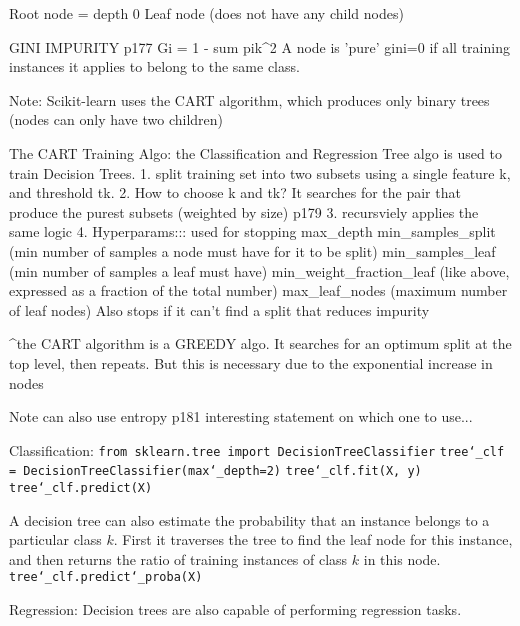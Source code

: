 Root node = depth 0
Leaf node (does not have any child nodes)

GINI IMPURITY
p177
Gi = 1 - sum pik^2
A node is 'pure' gini=0
if all training instances it applies to belong to the same class.

Note:
Scikit-learn uses the CART algorithm,
which produces only binary trees (nodes can only have two children)



The CART Training Algo:
the Classification and Regression Tree algo is used to train Decision Trees.
1. split training set into two subsets using a single feature k, and threshold tk.
2. How to choose k and tk?
It searches for the pair that produce the purest subsets (weighted by size)
p179
3. recursviely applies the same logic
4. Hyperparams::: used for stopping
max_depth
min_samples_split (min number of samples a node must have for it to be split)
min_samples_leaf (min number of samples a leaf must have)
min_weight_fraction_leaf (like above, expressed as a fraction of the total number)
max_leaf_nodes (maximum number of leaf nodes)
Also stops if it can't find a split that reduces impurity

^the CART algorithm is a GREEDY algo.
It searches for an optimum split at the top level, then repeats.
But this is necessary due to the exponential increase in nodes

Note can also use entropy p181
interesting statement on which one to use...

Classification:\newline
\texttt{from sklearn.tree import DecisionTreeClassifier}\newline
\texttt{tree\char`_clf = DecisionTreeClassifier(max\char`_depth=2)}\newline
\texttt{tree\char`_clf.fit(X, y)}\newline
\texttt{tree\char`_clf.predict(X)}\newline

A decision tree can also estimate the probability
that an instance belongs to a particular class $k$.\newline
% 
First it traverses the tree to find the leaf node for this instance,
and then returns the ratio of training instances of class $k$ in this node.\newline
\texttt{tree\char`_clf.predict\char`_proba(X)}

Regression:\newline
Decision trees are also capable of performing regression tasks.

